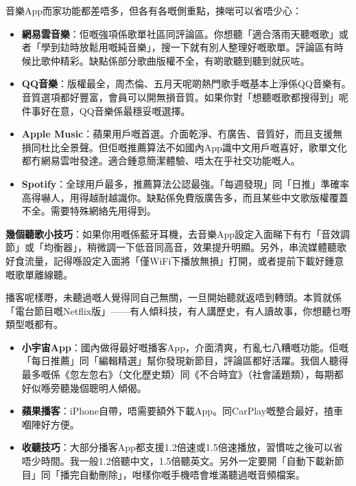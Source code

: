 


音樂App而家功能都差唔多，但各有各嘅側重點，揀啱可以省唔少心：

\begin{itemize}
  \item \textbf{網易雲音樂}：佢嘅強項係歌單社區同評論區。你想聽「適合落雨天聽嘅歌」或者「學到攰時放鬆用嘅純音樂」，搜一下就有別人整理好嘅歌單。評論區有時候比歌仲精彩。缺點係部分歌曲版權不全，有啲歌聽到聽到就灰咗。
  \item \textbf{QQ音樂}：版權最全，周杰倫、五月天呢啲熱門歌手嘅基本上淨係QQ音樂有。音質選項都好豐富，會員可以開無損音質。如果你對「想聽嘅歌都搜得到」呢件事好在意，QQ音樂係最穩妥嘅選擇。
  \item \textbf{Apple Music}：蘋果用戶嘅首選。介面乾淨、冇廣告、音質好，而且支援無損同杜比全景聲。但佢嘅推薦算法不如國內App識中文用戶嘅喜好，歌單文化都冇網易雲咁發達。適合鍾意簡潔體驗、唔太在乎社交功能嘅人。
  \item \textbf{Spotify}：全球用戶最多，推薦算法公認最強。「每週發現」同「日推」準確率高得嚇人，用得越耐越識你。缺點係免費版廣告多，而且某些中文歌版權覆蓋不全。需要特殊網絡先用得到。
\end{itemize}

\textbf{幾個聽歌小技巧}：如果你用嘅係藍牙耳機，去音樂App設定入面睇下有冇「音效調節」或「均衡器」，稍微調一下低音同高音，效果提升明顯。另外，串流媒體聽歌好食流量，記得喺設定入面將「僅WiFi下播放無損」打開，或者提前下載好鍾意嘅歌單離線聽。


播客呢樣嘢，未聽過嘅人覺得同自己無關，一旦開始聽就返唔到轉頭。本質就係「電台節目嘅Netflix版」——有人傾科技，有人講歷史，有人讀故事，你想聽乜嘢類型嘅都有。

\begin{itemize}
  \item \textbf{小宇宙App}：國內做得最好嘅播客App，介面清爽，冇亂七八糟嘅功能。佢嘅「每日推薦」同「編輯精選」幫你發現新節目，評論區都好活躍。我個人聽得最多嘅係《忽左忽右》（文化歷史類）同《不合時宜》（社會議題類），每期都好似喺旁聽幾個聰明人傾偈。
  \item \textbf{蘋果播客}：iPhone自帶，唔需要額外下載App。同CarPlay嘅整合最好，揸車嗰陣好方便。
  \item \textbf{收聽技巧}：大部分播客App都支援1.2倍速或1.5倍速播放，習慣咗之後可以省唔少時間。我一般1.2倍聽中文，1.5倍聽英文。另外一定要開「自動下載新節目」同「播完自動刪除」，咁樣你嘅手機唔會堆滿聽過嘅音頻檔案。
\end{itemize}

